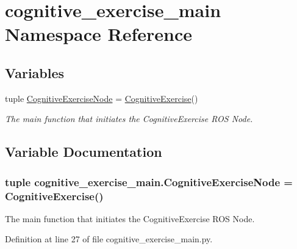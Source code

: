 \hypertarget{namespacecognitive__exercise__main}{\section{cognitive\-\_\-exercise\-\_\-main Namespace Reference}
\label{namespacecognitive__exercise__main}
}
\subsection*{Variables}
\begin{DoxyCompactItemize}
\item 
tuple \hyperlink{namespacecognitive__exercise__main_a9e8ef96f956fde0e9e57e46c76da6ada}{Cognitive\-Exercise\-Node} = \hyperlink{classcognitive__exercise_1_1CognitiveExercise}{Cognitive\-Exercise}()
\begin{DoxyCompactList}\small\item\em The main function that initiates the Cognitive\-Exercise R\-O\-S Node. \end{DoxyCompactList}\end{DoxyCompactItemize}


\subsection{Variable Documentation}
\hypertarget{namespacecognitive__exercise__main_a9e8ef96f956fde0e9e57e46c76da6ada}{
\subsubsection[{Cognitive\-Exercise\-Node}]{\setlength{\rightskip}{0pt plus 5cm}tuple cognitive\-\_\-exercise\-\_\-main.\-Cognitive\-Exercise\-Node = {\bf Cognitive\-Exercise}()}}\label{namespacecognitive__exercise__main_a9e8ef96f956fde0e9e57e46c76da6ada}


The main function that initiates the Cognitive\-Exercise R\-O\-S Node. 



Definition at line 27 of file cognitive\-\_\-exercise\-\_\-main.\-py.

